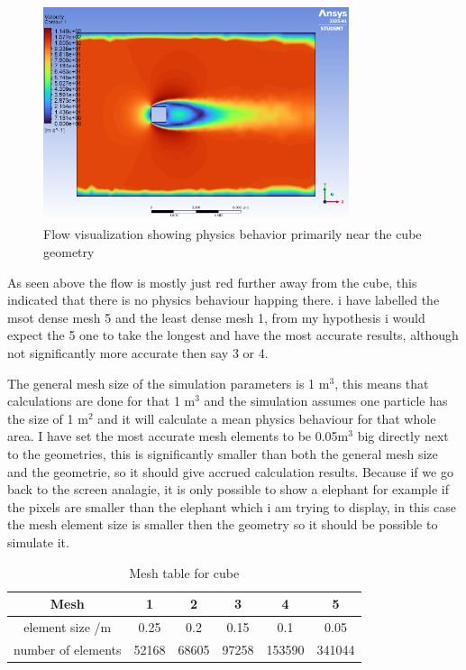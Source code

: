 \documentclass[12pt,a4paper]{article}
\begin{document}
\begin{figure}[H]
\centering
\includegraphics[width=0.8\textwidth]{image1.png}
\caption{Flow visualization showing physics behavior primarily near the cube geometry}
\end{figure}

As seen above the flow is mostly just red further away from the cube, this indicated that there is no physics behaviour happing there. i have labelled the msot dense mesh 5 and the least dense mesh 1, from my hypothesis i would expect the 5 one to take the longest and have the most accurate results, although not significantly more accurate then say 3 or 4. 

The general mesh size of the simulation parameters is 1 m$^3$, this means that calculations are done for that 1 m$^3$ and the simulation assumes one particle has the size of 1 m$^2$ and it will calculate a mean physics behaviour for that whole area. I have set the most accurate mesh elements to be 0.05m$^3$ big directly next to the geometries, this is significantly smaller than both the general mesh size and the geometrie, so it should give accrued calculation results. Because if we go back to the screen analagie, it is only possible to show a elephant for example if the pixels are smaller than the elephant which i am trying to display, in this case the mesh element size is smaller then the geometry so it should be possible to simulate it.

\begin{table}[H]
\centering
\caption{Mesh table for cube}
\begin{tabular}{|c|c|c|c|c|c|}
\hline
\textbf{Mesh} & \textbf{1} & \textbf{2} & \textbf{3} & \textbf{4} & \textbf{5} \\
\hline
element size /m & 0.25 & 0.2 & 0.15 & 0.1 & 0.05 \\
\hline
number of elements & 52168 & 68605 & 97258 & 153590 & 341044 \\
\hline
\end{tabular}
\end{table}
\end{document}
